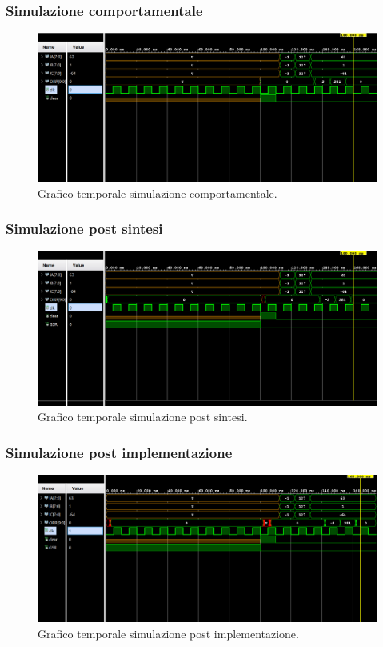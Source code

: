 \documentclass[12pt]{article}
\begin{document}
        \subsubsection{Simulazione comportamentale}
            \begin{figure}[ht]
                \centering
                \includegraphics[scale=0.55]{Test_RTL.png}
                \caption{Grafico temporale simulazione comportamentale.}
            \end{figure}
            \newpage

        \subsubsection{Simulazione post sintesi}
            \begin{figure}[ht]
                \centering
                \includegraphics[scale=0.55]{Test_Sin.png}
                \caption{Grafico temporale simulazione post sintesi.}
            \end{figure}
            \newpage

        \subsubsection{Simulazione post implementazione}
            \begin{figure}[ht]
                \centering
                \includegraphics[scale=0.55]{Test.png}
                \caption{Grafico temporale simulazione post implementazione.}
            \end{figure}
\end{document}
